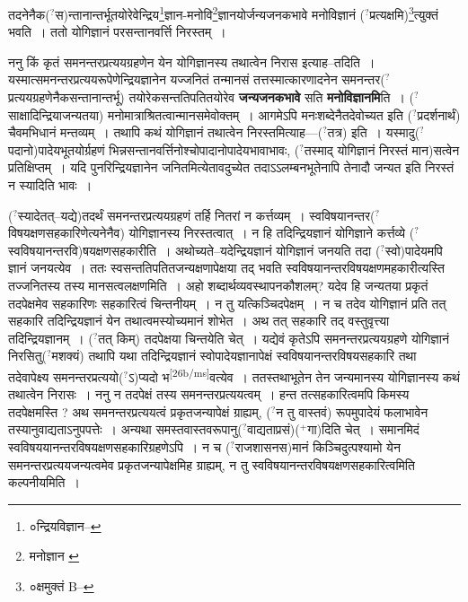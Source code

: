 \documentclass[article,12pt,a4paper]{memoir}
\newcommand{\unclear}[1]{($^{?}$#1)}
\newcommand{\add}[1]{($^{+}$#1)}
\begin{document}
	  \pstart तदनेनैक\unclear{स}न्तानान्तर्भूतयोरेवेन्द्रिय\footnote{०न्द्रियविज्ञान--\cite{dp-msC}}ज्ञान-मनोवि\footnote{मनोज्ञान \cite{dp-msA} \cite{dp-msB} \cite{dp-edP} \cite{dp-edH} \cite{dp-edE}}ज्ञानयोर्जन्यजनकभावे मनोविज्ञानं \unclear{प्रत्यक्षमि}\footnote{०क्षमुक्तं B--}त्युक्तं भवति । ततो योगिज्ञानं परसन्तानवर्त्ति निरस्तम् ।
	\pend
      

	  \pstart ननु किं कृतं समनन्तरप्रत्ययग्रहणेन येन योगिज्ञानस्य तथात्वेन निरास इत्याह--तदिति । यस्मात्समनन्तरप्रत्ययरूपेणेन्द्रियज्ञानेन यज्जनितं तन्मानसं तत्तस्मात्कारणादनेन समनन्तर\unclear{प्रत्ययग्रहणेनैकसन्तानान्तर्भू} तयोरेकसन्ततिपतितयोरेव \textbf{जन्यजनकभावे} सति \textbf{मनोविज्ञानमि}ति । \unclear{साक्षादिन्द्रियाजन्यतया} मनोमात्राश्रितत्वान्मानसमेवोक्तम् । आगमेऽपि मनःशब्देनैतदेवोच्यत इति \unclear{प्रदर्शनार्थं} चैवमभिधानं मन्तव्यम् । तथापि कथं योगिज्ञानं तथात्वेन निरस्तमित्याह—\unclear{तत्र} इति । यस्मादु\unclear{पदानो}पादेयभूतयोर्ग्रहणं भिन्नसन्तानवर्त्तिनोश्चोपादानोपादेयभावाभावः, \unclear{तस्माद् योगिज्ञानं निरस्तं मान}सत्वेन प्रतिक्षिप्तम् । यदि पुनरिन्द्रियज्ञानेन जनितमित्येतावदुच्येत तदाऽऽलम्बनभूतेनापि तेनादौ जन्यत इति निरस्तं न स्यादिति भावः ।
	\pend
      

	  \pstart \unclear{स्यादेतत्--यद्ये}तदर्थं समनन्तरप्रत्ययग्रहणं तर्हि नितरां न कर्त्तव्यम् । स्वविषयानन्तर\unclear{विषयक्षणसहकारिणेत्यनेनैव} योगिज्ञानस्य निरस्तत्वात् । न हि तदिन्द्रियज्ञानं योगिज्ञाने कर्त्तव्ये \unclear{स्वविषयानन्तरवि}षयक्षणसहकारीति । अथोच्यते--यदेन्द्रियज्ञानं योगिज्ञानं जनयति तदा \unclear{स्वो}पादेयमपि ज्ञानं जनयत्येव । ततः स्वसन्ततिपतितजन्यक्षणापेक्षया तद् भवति स्वविषयानन्तरविषयक्षणमहकारीत्यस्ति तज्जनितस्य तस्य मानसत्वलक्षणमिति । अहो शब्दार्थव्यवस्थापनकौशलम्? यदेव हि जन्यतया प्रकृतं तदपेक्षमेव सहकारिणः सहकारित्वं चिन्तनीयम् । न तु यत्किञ्चिदपेक्षम् । न च तदेव योगिज्ञानं प्रति तत् सहकारि तदिन्द्रियज्ञानं येन तथात्वमस्योच्यमानं शोभेत । अथ तत् सहकारि तद् वस्तुवृत्त्या तदिन्द्रियज्ञानम् । \unclear{तत् किम्} तदपेक्षया चिन्तयेति चेत् । यद्येवं कृतेऽपि समनन्तरप्रत्ययग्रहणे योगिज्ञानं निरसितु\unclear{मशक्यं} तथापि यथा तदिन्द्रियज्ञानं स्वोपादेयज्ञानापेक्षं स्वविषयानन्तरविषयसहकारि तथा तदेवापेक्ष्य समनन्तरप्रत्ययो\unclear{ऽ}प्यदो भ\leavevmode\textsuperscript{\rmlatinfont\tiny [26b/ms]}वत्येव । ततस्तथाभूतेन तेन जन्यमानस्य योगिज्ञानस्य कथं तथात्वेन निरासः । ननु न तदपेक्षं तस्य समनन्तरप्रत्ययत्वम् । हन्त तत्सहकारित्वमपि किमस्य तदपेक्षमस्ति ? अथ समनन्तरप्रत्ययत्वं प्रकृतजन्यापेक्षं ग्राह्यम्, \unclear{न तु वास्तवं} रूपमुपादेयं फलाभावेन तस्यानुवाद्यताऽनुपपत्तेः । अन्यथा समस्तवास्तवरूपानु\unclear{वाद्यताप्रसं}\add{गा}दिति चेत् । समानमिदं स्वविषययानन्तरविषयक्षणसहकारिग्रहणेऽपि । न च \unclear{राजशासनस}मानं किञ्चिदुत्पश्यामो येन समनन्तरप्रत्ययजन्यत्वमेव प्रकृतजन्यापेक्षमिह ग्राह्यम्, न तु स्वविषयानन्तरविषयक्षणसहकारित्वमिति कल्पनीयमिति ।
	\pend
      
\end{document}
